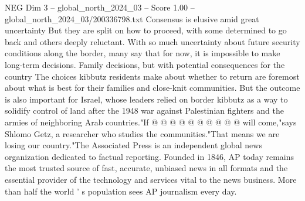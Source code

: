 \begin{textsample}{NEG Dim 3 – global\_north\_2024\_03 – Score 1.00 – global\_north\_2024\_03/200336798.txt}
Consensus is elusive amid great uncertainty But they are split on how to proceed, with some determined to go back and others deeply reluctant.
With so much uncertainty about future security conditions along the border, many say that for now, it is impossible to make long-term decisions.
Family decisions, but with potential consequences for the country The choices kibbutz residents make about whether to return are foremost about what is best for their families and close-knit communities.
But the outcome is also important for Israel, whose leaders relied on border kibbutz as a way to solidify control of land after the 1948 war against Palestinian fighters and the armies of neighboring Arab countries."If @ @ @ @ @ @ @ @ @ @ will come,"says Shlomo Getz, a researcher who studies the communities."That means we are losing our country."The Associated Press is an independent global news organization dedicated to factual reporting.
Founded in 1846, AP today remains the most trusted source of fast, accurate, unbiased news in all formats and the essential provider of the technology and services vital to the news business.
More than half the world ' s population sees AP journalism every day.

\end{textsample}

